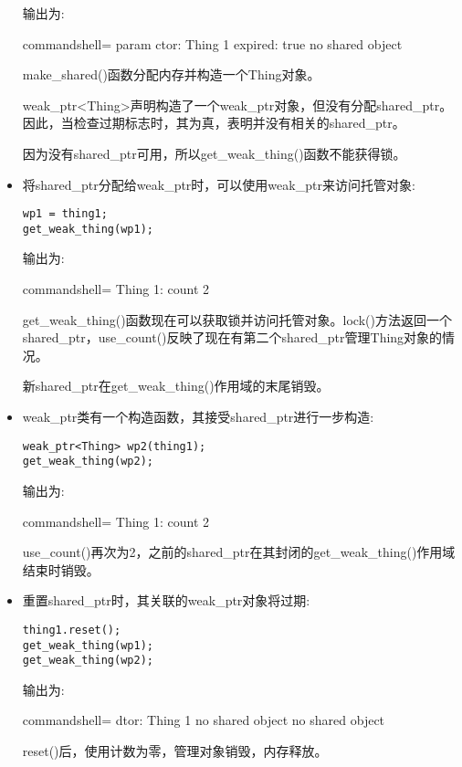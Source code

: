 \begin{itemize}
输出为:

\begin{tcblisting}{commandshell={}}
param ctor: Thing 1
expired: true
no shared object
\end{tcblisting}

make\_shared()函数分配内存并构造一个Thing对象。

weak\_ptr<Thing>声明构造了一个weak\_ptr对象，但没有分配shared\_ptr。因此，当检查过期标志时，其为真，表明并没有相关的shared\_ptr。

因为没有shared\_ptr可用，所以get\_weak\_thing()函数不能获得锁。

\item 
将shared\_ptr分配给weak\_ptr时，可以使用weak\_ptr来访问托管对象:

\begin{lstlisting}[style=styleCXX]
wp1 = thing1;
get_weak_thing(wp1);
\end{lstlisting}

输出为:

\begin{tcblisting}{commandshell={}}
Thing 1: count 2
\end{tcblisting}

get\_weak\_thing()函数现在可以获取锁并访问托管对象。lock()方法返回一个shared\_ptr，use\_count()反映了现在有第二个shared\_ptr管理Thing对象的情况。

新shared\_ptr在get\_weak\_thing()作用域的末尾销毁。

\item 
weak\_ptr类有一个构造函数，其接受shared\_ptr进行一步构造:

\begin{lstlisting}[style=styleCXX]
weak_ptr<Thing> wp2(thing1);
get_weak_thing(wp2);
\end{lstlisting}

输出为:

\begin{tcblisting}{commandshell={}}
Thing 1: count 2
\end{tcblisting}

use\_count()再次为2，之前的shared\_ptr在其封闭的get\_weak\_thing()作用域结束时销毁。

\item 
重置shared\_ptr时，其关联的weak\_ptr对象将过期:

\begin{lstlisting}[style=styleCXX]
thing1.reset();
get_weak_thing(wp1);
get_weak_thing(wp2);
\end{lstlisting}

输出为:

\begin{tcblisting}{commandshell={}}
dtor: Thing 1
no shared object
no shared object
\end{tcblisting}

reset()后，使用计数为零，管理对象销毁，内存释放。
\end{itemize}



